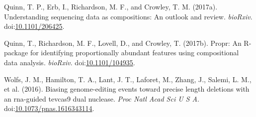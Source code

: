 \documentclass[twocolumn]{article}
\begin{document}
\leavevmode\hypertarget{ref-Quinn206425}{}%
Quinn, T. P., Erb, I., Richardson, M. F., and Crowley, T. M. (2017a).
Understanding sequencing data as compositions: An outlook and review.
\emph{bioRxiv}.
doi:\href{https://doi.org/10.1101/206425}{10.1101/206425}.

\leavevmode\hypertarget{ref-Quinn:2017}{}%
Quinn, T., Richardson, M. F., Lovell, D., and Crowley, T. (2017b).
Propr: An R-package for identifying proportionally abundant features
using compositional data analysis. \emph{bioRxiv}.
doi:\href{https://doi.org/10.1101/104935}{10.1101/104935}.

\leavevmode\hypertarget{ref-Wolfs:2016aa}{}%
Wolfs, J. M., Hamilton, T. A., Lant, J. T., Laforet, M., Zhang, J.,
Salemi, L. M., et al. (2016). Biasing genome-editing events toward
precise length deletions with an rna-guided tevcas9 dual nuclease.
\emph{Proc Natl Acad Sci U S A}.
doi:\href{https://doi.org/10.1073/pnas.1616343114}{10.1073/pnas.1616343114}.
\end{document}
